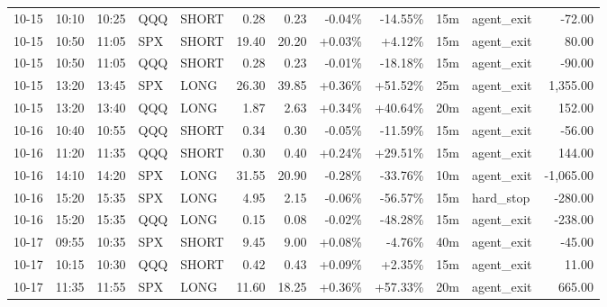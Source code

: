 \documentclass[11pt,a4paper]{article}
\begin{document}
\begin{center}
\begin{longtable}{>{\color{txtmain}}l l l l l r r r r r >{\color{txtmain}}l r}
10-15 & 10:10 & 10:25 & QQQ & SHORT & 0.28 & 0.23 & \textcolor{lossred}{-0.04\%} & \textcolor{lossred}{-14.55\%} & 15m & agent\_exit & \textcolor{lossred}{-72.00} \\
10-15 & 10:50 & 11:05 & SPX & SHORT & 19.40 & 20.20 & \textcolor{wingreen}{+0.03\%} & \textcolor{wingreen}{+4.12\%} & 15m & agent\_exit & \textcolor{wingreen}{80.00} \\
10-15 & 10:50 & 11:05 & QQQ & SHORT & 0.28 & 0.23 & \textcolor{lossred}{-0.01\%} & \textcolor{lossred}{-18.18\%} & 15m & agent\_exit & \textcolor{lossred}{-90.00} \\
10-15 & 13:20 & 13:45 & SPX & LONG & 26.30 & 39.85 & \textcolor{wingreen}{+0.36\%} & \textcolor{wingreen}{+51.52\%} & 25m & agent\_exit & \textcolor{wingreen}{1,355.00} \\
10-15 & 13:20 & 13:40 & QQQ & LONG & 1.87 & 2.63 & \textcolor{wingreen}{+0.34\%} & \textcolor{wingreen}{+40.64\%} & 20m & agent\_exit & \textcolor{wingreen}{152.00} \\
10-16 & 10:40 & 10:55 & QQQ & SHORT & 0.34 & 0.30 & \textcolor{lossred}{-0.05\%} & \textcolor{lossred}{-11.59\%} & 15m & agent\_exit & \textcolor{lossred}{-56.00} \\
10-16 & 11:20 & 11:35 & QQQ & SHORT & 0.30 & 0.40 & \textcolor{wingreen}{+0.24\%} & \textcolor{wingreen}{+29.51\%} & 15m & agent\_exit & \textcolor{wingreen}{144.00} \\
10-16 & 14:10 & 14:20 & SPX & LONG & 31.55 & 20.90 & \textcolor{lossred}{-0.28\%} & \textcolor{lossred}{-33.76\%} & 10m & agent\_exit & \textcolor{lossred}{-1,065.00} \\
10-16 & 15:20 & 15:35 & SPX & LONG & 4.95 & 2.15 & \textcolor{lossred}{-0.06\%} & \textcolor{lossred}{-56.57\%} & 15m & hard\_stop & \textcolor{lossred}{-280.00} \\
10-16 & 15:20 & 15:35 & QQQ & LONG & 0.15 & 0.08 & \textcolor{lossred}{-0.02\%} & \textcolor{lossred}{-48.28\%} & 15m & agent\_exit & \textcolor{lossred}{-238.00} \\
10-17 & 09:55 & 10:35 & SPX & SHORT & 9.45 & 9.00 & \textcolor{wingreen}{+0.08\%} & \textcolor{lossred}{-4.76\%} & 40m & agent\_exit & \textcolor{lossred}{-45.00} \\
10-17 & 10:15 & 10:30 & QQQ & SHORT & 0.42 & 0.43 & \textcolor{wingreen}{+0.09\%} & \textcolor{wingreen}{+2.35\%} & 15m & agent\_exit & \textcolor{wingreen}{11.00} \\
10-17 & 11:35 & 11:55 & SPX & LONG & 11.60 & 18.25 & \textcolor{wingreen}{+0.36\%} & \textcolor{wingreen}{+57.33\%} & 20m & agent\_exit & \textcolor{wingreen}{665.00} \\

\end{longtable}
\end{center}
\end{document}
